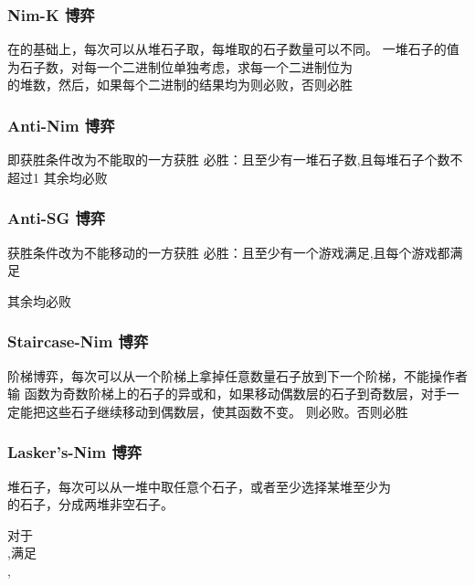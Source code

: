 \documentclass[8pt,a4paper]{article}
\newcommand{\txt}[1]{\par\noindent\footnotesize #1}
\newcommand{\inlineformula}[1]{\ensuremath{}}
\newcommand{\displayformula}[1]{%
    \vspace{0.2em}
    \[
        
    \]
}
\begin{document}
\begin{multicols}{2}
        \subsubsection{Nim-K 博弈}
            \txt{在\inlineformula{./assets/formulas_tex/formula_542.tex}的基础上，每次可以从\inlineformula{./assets/formulas_tex/formula_543.tex}堆石子取，每堆取的石子数量可以不同。
一堆石子的\inlineformula{./assets/formulas_tex/formula_544.tex}值为石子数，对每一个二进制位单独考虑，求每一个二进制位为\displayformula{./assets/formulas_tex/formula_545.tex}的堆数，然后\inlineformula{./assets/formulas_tex/formula_546.tex}，如果每个二进制的结果均为\inlineformula{./assets/formulas_tex/formula_547.tex}则必败，否则必胜}
        \subsubsection{Anti-Nim 博弈}
            \txt{即获胜条件改为不能取的一方获胜
必胜：\inlineformula{./assets/formulas_tex/formula_549.tex}且至少有一堆石子数\inlineformula{./assets/formulas_tex/formula_550.tex},\inlineformula{./assets/formulas_tex/formula_551.tex}且每堆石子个数不超过1
其余均必败}
        \subsubsection{Anti-SG 博弈}
            \txt{获胜条件改为不能移动的一方获胜
必胜：\inlineformula{./assets/formulas_tex/formula_553.tex}且至少有一个游戏满足\inlineformula{./assets/formulas_tex/formula_554.tex},\inlineformula{./assets/formulas_tex/formula_555.tex}且每个游戏都满足\displayformula{./assets/formulas_tex/formula_556.tex}
其余均必败}
        \subsubsection{Staircase-Nim 博弈}
            \txt{阶梯博弈，每次可以从一个阶梯上拿掉任意数量石子放到下一个阶梯，不能操作者输
\inlineformula{./assets/formulas_tex/formula_558.tex}函数为奇数阶梯上的石子的异或和，如果移动偶数层的石子到奇数层，对手一定能把这些石子继续移动到偶数层，使其\inlineformula{./assets/formulas_tex/formula_559.tex}函数不变。
\inlineformula{./assets/formulas_tex/formula_560.tex}则必败。否则必胜}
        \subsubsection{Lasker's-Nim 博弈}
            \txt{\displayformula{./assets/formulas_tex/formula_562.tex}堆石子，每次可以从一堆中取任意个石子，或者至少选择某堆至少为\displayformula{./assets/formulas_tex/formula_563.tex}的石子，分成两堆非空石子。
\displayformula{./assets/formulas_tex/formula_564.tex}
对于\displayformula{./assets/formulas_tex/formula_565.tex},满足\displayformula{./assets/formulas_tex/formula_566.tex},\displayformula{./assets/formulas_tex/formula_567.tex}
\displayformula{./assets/formulas_tex/formula_568.tex}}

\end{multicols}
\end{document}
